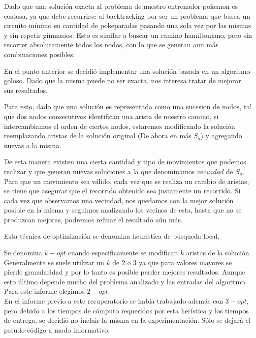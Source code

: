 Dado que una solución exacta al problema de nuestro entrenador pokemon es costosa, ya que debe recurrirse al backtracking por ser un problema que busca un circuito mínimo en cantidad de pokeparadas pasando una sola vez por las mismas y sin repetir gimnasios. Esto es similar a buscar un camino hamiltoniano, pero sin recorrer absolutamente todos los nodos, con lo que se generan aun más combinaciones posibles.

En el punto anterior se decidió implementar una solución basada en un algoritmo goloso. Dado que la misma puede no ser exacta, nos interesa tratar de mejorar sus resultados. 

Para esto, dado que una solución es representada como una sucesion de nodos, tal que dos nodos consecutivos identifican una arista de nuestro camino, si intercambiamos el orden de ciertos nodos, estaremos modificando la solución reemplazando aristas de la solución original (De ahora en más $S_o$) y agregando nuevas a la misma. 

De esta manera existen una cierta cantidad y tipo de movimientos que podemos realizar y que generan nuevas soluciones a la que denominamos $vecindad$ de $S_o$.
Para que un movimiento sea válido, cada vez que se realiza un cambio de aristas, se tiene que asegurar que el recorrido obtenido sea justamente un recorrido.
Si cada vez que observamos una vecindad, nos quedamos con la mejor solución posible en la misma y seguimos analizando los vecinos de esta, hasta que no se produzcan mejoras, podremos refinar el resultado aún más.

Esta técnica de optimización se denomina heurística de búsqueda local.

Se denomina $k-opt$ cuando especificamente se modifican $k$ aristas de la solución. Generalmente se suele utilizar un $k$ de 2 o 3 ya que para valores mayores se pierde granularidad y por lo tanto es posible perder mejores resultados. Aunque esto último depende mucho del problema analizado y las entradas del algoritmo. Para este informe elegimos $2-opt$.\\ 

En el informe previo a este recuperatorio se había trabajado además con $3-opt$, pero debido a los tiempos de cómputo requeridos por esta herística y los tiempos de entrega, se decidió no incluir la misma en la experimentación. Sólo se dejará el pseudo-código a modo informativo.

